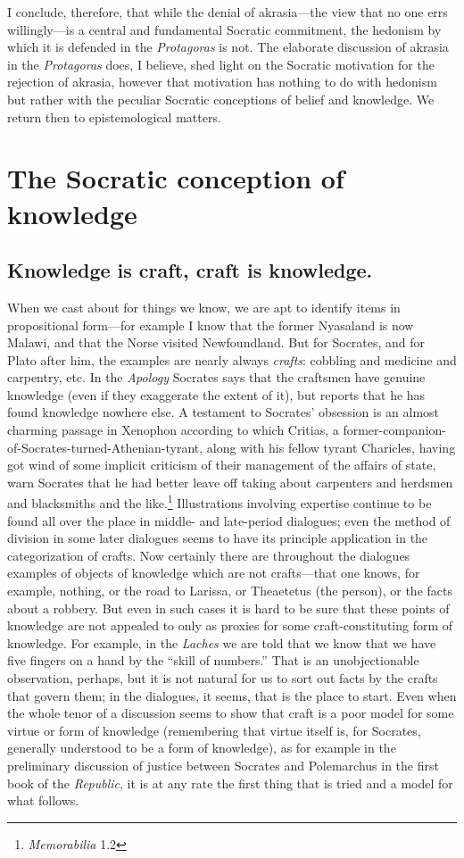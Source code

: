 \documentclass[11pt]{amsart}
\begin{document}
I conclude, therefore, that while the denial of akrasia---the view that no one errs willingly---is a central and fundamental Socratic commitment, the hedonism by which it is defended in the \emph{Protagoras} is not. The elaborate discussion of akrasia in the \emph{Protagoras} does, I believe, shed light on the Socratic motivation for the rejection of akrasia, however that motivation has nothing to do with hedonism but rather with the peculiar Socratic conceptions of belief and knowledge. We return then to epistemological matters.


\section{The Socratic conception of knowledge}

\subsection{Knowledge is craft, craft is knowledge.} When we cast about for things we know, we are apt to identify items in propositional form---for example I know that the former Nyasaland is now Malawi, and that the Norse visited Newfoundland. But for Socrates, and for Plato after him, the examples are nearly always \emph{crafts}: cobbling and medicine and carpentry, etc. In the \emph{Apology} Socrates says that the craftsmen have genuine knowledge (even if they exaggerate the extent of it), but reports that he has found knowledge nowhere else. A testament to Socrates' obsession is an almost charming passage in Xenophon according to which Critias, a former-companion-of-Socrates-turned-Athenian-tyrant, along with his fellow tyrant Charicles, having got wind of some implicit criticism of their management of the affairs of state, warn Socrates that he had better leave off taking about carpenters and herdsmen and blacksmiths and the like.\footnote{\emph{Memorabilia} 1.2} Illustrations involving expertise continue to be found all over the place in middle- and late-period dialogues; even the method of division in some later dialogues seems to have its principle application in the categorization of crafts. Now certainly there are throughout the dialogues examples of objects of knowledge which are not crafts---that one knows, for example, nothing, or the road to Larissa, or Theaetetus (the person), or the facts about a robbery. But even in such cases it is hard to be sure that these points of knowledge are not appealed to only as proxies for some craft-constituting form of knowledge. For example, in the \emph{Laches} we are told that we know that we have five fingers on a hand by the ``skill of numbers.'' That is an unobjectionable observation, perhaps, but it is not natural for us to sort out facts by the crafts that govern them; in the dialogues, it seems, that is the place to start. Even when the whole tenor of a discussion seems to show that craft is a poor model for some virtue or form of knowledge (remembering that virtue itself is, for Socrates, generally understood to be a form of knowledge), as for example in the preliminary discussion of justice between Socrates and Polemarchus in the first book of the \emph{Republic}, it is at any rate the first thing that is tried and a model for what follows.
\end{document}
